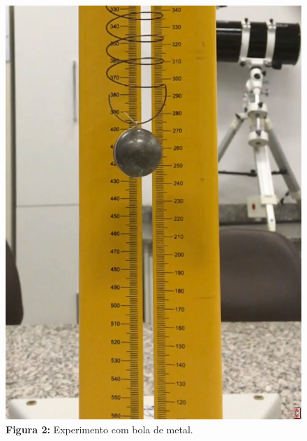 \documentclass[a4paper, 12pt]{article}
\begin{document}
\begin{multicols}{2}
\begin{figure}[H]
				\includegraphics[scale=0.3]{./img/bolaMetal.png}
				\captionsetup{labelformat=empty}
				\caption{\textbf{Figura 2:} Experimento com bola de metal.}
			\end{figure}
			

\end{multicols}
\end{document}
